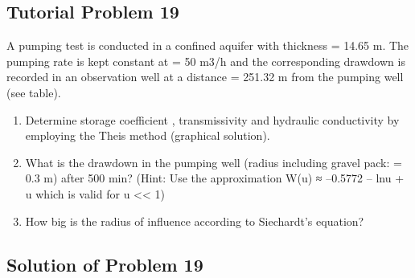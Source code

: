 \documentclass[letterpaper,10pt,english]{jupyterBook}
\begin{document}
\subsection{Tutorial Problem 19}
\label{\detokenize{content/tutorials/T7/tutorial_07:tutorial-problem-19}}
\sphinxAtStartPar
A pumping test is conducted in a confined aquifer with thickness  = 14.65 m.
The pumping rate is kept constant at  = 50 m3/h and the corresponding drawdown
 is recorded in an observation well at a distance  = 251.32 m from the pumping well (see table).
\begin{enumerate}
%
\item {} 
\sphinxAtStartPar
Determine storage coefficient ,  transmissivity   and hydraulic conductivity  by employing
the Theis method (graphical solution).

\item {} 
\sphinxAtStartPar
What is the drawdown in the pumping well (radius including gravel pack:  = 0.3 m) after 500 min?                               (Hint: Use the approximation          W(u) ≈ –0.5772 – lnu + u which is valid for u << 1)


\item {} 
\sphinxAtStartPar
How big is the radius of influence according to Siechardt’s equation?


\end{enumerate}


\subsection{Solution of Problem 19}
\label{\detokenize{content/tutorials/T7/tutorial_07:solution-of-problem-19}}
\sphinxAtStartPar
{}
\end{document}
